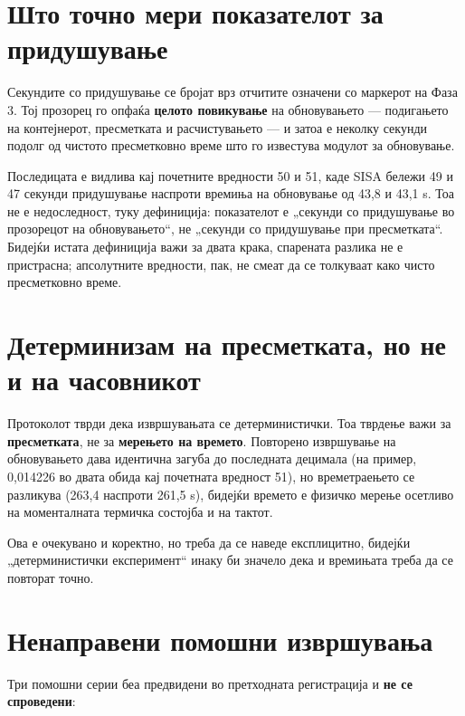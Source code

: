 \section{Што точно мери показателот за придушување}

Секундите со придушување се бројат врз отчитите означени со маркерот на Фаза 3. Тој
прозорец го опфаќа \textbf{целото повикување} на обновувањето --- подигањето на контејнерот,
пресметката и расчистувањето --- и затоа е неколку секунди подолг од чистото пресметковно
време што го известува модулот за обновување.

Последицата е видлива кај почетните вредности 50 и 51, каде SISA бележи 49 и 47 секунди
придушување наспроти времиња на обновување од 43,8 и 43,1 s. Тоа не е недоследност, туку
дефиниција: показателот е „секунди со придушување во прозорецот на обновувањето“, не
„секунди со придушување при пресметката“. Бидејќи истата дефиниција важи за двата крака,
спарената разлика не е пристрасна; апсолутните вредности, пак, не смеат да се толкуваат
како чисто пресметковно време.

\section{Детерминизам на пресметката, но не и на часовникот}

Протоколот тврди дека извршувањата се детерминистички. Тоа тврдење важи за
\textbf{пресметката}, не за \textbf{мерењето на времето}. Повторено извршување на обновувањето дава
идентична загуба до последната децимала (на пример, 0,014226 во двата обида кај почетната
вредност 51), но времетраењето се разликува (263,4 наспроти 261,5 s), бидејќи времето е
физичко мерење осетливо на моменталната термичка состојба и на тактот.

Ова е очекувано и коректно, но треба да се наведе експлицитно, бидејќи „детерминистички
експеримент“ инаку би значело дека и времињата треба да се повторат точно.

\section{Ненаправени помошни извршувања}

Три помошни серии беа предвидени во претходната регистрација и \textbf{не се спроведени}:

